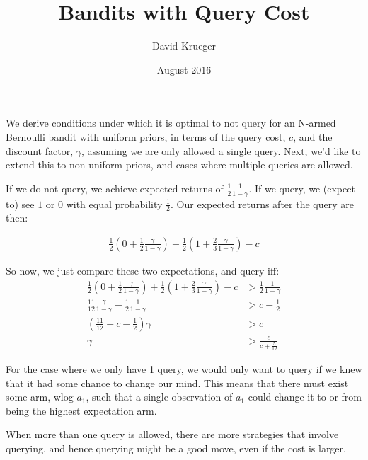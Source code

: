 \documentclass{article}
\title{Bandits with Query Cost}
\author{David Krueger}
\date{August 2016}
\begin{document}
\maketitle


We derive conditions under which it is optimal to not query for an N-armed Bernoulli bandit with uniform priors, in terms of the query cost, $c$, and the discount factor, $\gamma$, assuming we are only allowed a single query.
Next, we'd like to extend this to non-uniform priors, and cases where multiple queries are allowed.

If we do not query, we achieve expected returns of $\frac{1}{2}\frac{1}{1-\gamma}$.
If we query, we (expect to) see $1$ or $0$ with equal probability $\frac{1}{2}$.
Our expected returns after the query are then:

\begin{align}
\frac{1}{2} (0 + \frac{1}{2}\frac{\gamma}{1-\gamma}) + \frac{1}{2}(1 + \frac{2}{3}\frac{\gamma}{1-\gamma}) - c
\end{align}

So now, we just compare these two expectations, and query iff:
\begin{align}
\frac{1}{2}(0 + \frac{1}{2}\frac{\gamma}{1-\gamma}) + \frac{1}{2}(1 + \frac{2}{3}\frac{\gamma}{1-\gamma}) - c &> \frac{1}{2}\frac{1}{1-\gamma} \\
\frac{11}{12}\frac{\gamma}{1-\gamma} - \frac{1}{2}\frac{1}{1-\gamma} &> c - \frac{1}{2} \\
(\frac{11}{12} + c - \frac{1}{2}) \gamma &> c \\
\gamma &> \frac{c}{c + \frac{5}{12}}
\end{align}


For the case where we only have 1 query, we would only want to query if we knew that it had some chance to change our mind.
This means that there must exist some arm, wlog $a_1$, such that a single observation of $a_1$ could change it to or from being the highest expectation arm.


When more than one query is allowed, there are more strategies that involve querying, and hence querying might be a good move, even if the cost is larger.




%

\end{document}
